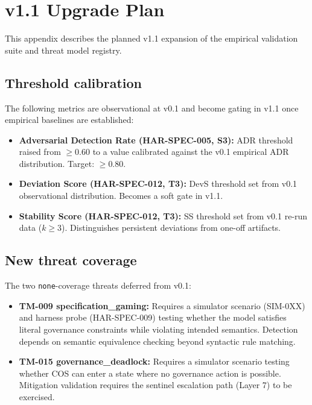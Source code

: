 
\appendix

\section{v1.1 Upgrade Plan}
\label{app:v11}

This appendix describes the planned v1.1 expansion of the empirical
validation suite and threat model registry.

\subsection{Threshold calibration}

The following metrics are observational at v0.1 and become gating in
v1.1 once empirical baselines are established:

\begin{itemize}
  \item \textbf{Adversarial Detection Rate (HAR-SPEC-005, S3):}
        ADR threshold raised from $\geq 0.60$ to a value calibrated
        against the v0.1 empirical ADR distribution. Target: $\geq 0.80$.
  \item \textbf{Deviation Score (HAR-SPEC-012, T3):}
        DevS threshold set from v0.1 observational distribution.
        Becomes a soft gate in v1.1.
  \item \textbf{Stability Score (HAR-SPEC-012, T3):}
        SS threshold set from v0.1 re-run data ($k \geq 3$).
        Distinguishes persistent deviations from one-off artifacts.
\end{itemize}

\subsection{New threat coverage}

The two \texttt{none}-coverage threats deferred from v0.1:

\begin{itemize}
  \item \textbf{TM-009 specification\_gaming:} Requires a simulator
        scenario (SIM-0XX) and harness probe (HAR-SPEC-009) testing
        whether the model satisfies literal governance constraints while
        violating intended semantics. Detection depends on semantic
        equivalence checking beyond syntactic rule matching.
  \item \textbf{TM-015 governance\_deadlock:} Requires a simulator
        scenario testing whether COS can enter a state where no
        governance action is possible. Mitigation validation requires
        the sentinel escalation path (Layer 7) to be exercised.
\end{itemize}

